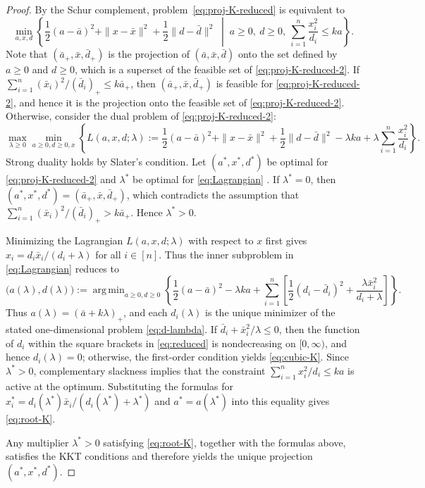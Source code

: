 \documentclass[11pt]{article}
\DeclareMathOperator*{\argmin}{arg\,min}
\theoremstyle{plain}
\begin{document}
\begin{proof}\;
By the Schur complement, problem~\eqref{eq:proj-K-reduced} is equivalent to
\begin{equation}
\label{eq:proj-K-reduced-2}
\min_{a,x,d}\left\{
\frac12(a-\bar a)^2+\|x-\bar x\|^2+\frac12\|d-\bar d\|^2
\;\middle|\;
a\ge 0,\ d\ge 0,\ \sum_{i=1}^n \frac{x_i^2}{d_i}\le k a
\right\}.
\end{equation}
Note that $(\bar{a}_+,\bar{x},\bar{d}_+)$ is the projection of $(\bar a,\bar x,\bar d)$ onto the set defined by $a\ge 0$ and $d\ge 0$, which is a superset of the feasible set of \eqref{eq:proj-K-reduced-2}.
If
 $\sum_{i=1}^n (\bar{x}_i)^2/(\bar{d}_i)_+\le k \bar{a}_+$,
then $(\bar{a}_+,\bar{x},\bar{d}_+)$ is feasible for \eqref{eq:proj-K-reduced-2}, and hence it is the projection onto the feasible set of \eqref{eq:proj-K-reduced-2}.
Otherwise, consider the dual problem of \eqref{eq:proj-K-reduced-2}:
\begin{equation} \label{eq:Lagrangian}
\max_{\lambda\ge 0}\min_{a\geq 0,d\geq 0,x}\left\{
L(a,x,d;\lambda):=\frac12(a-\bar a)^2+\|x-\bar x\|^2+\frac12\|d-\bar d\|^2
-\lambda k a + \lambda \sum_{i=1}^n \frac{x_i^2}{d_i}
\right\}.
\end{equation}
Strong duality holds by Slater's condition. Let $(a^*,x^*,d^*)$ be optimal for 
\eqref{eq:proj-K-reduced-2}
and $\lambda^*$ be optimal for \eqref{eq:Lagrangian} . If $\lambda^*=0$, then 
$(a^*,x^*,d^*)=(\bar{a}_+,\bar{x},\bar{d}_+)$, which contradicts the assumption that $\sum_{i=1}^n (\bar{x}_i)^2/(\bar{d}_i)_+ > k \bar{a}_+$. Hence $\lambda^*>0$.

Minimizing the Lagrangian $L(a,x,d;\lambda)$ with respect to $x$ first gives $x_i=d_i\bar x_i/(d_i+\lambda)$ for all $i\in[n]$. Thus the inner subproblem in \eqref{eq:Lagrangian} reduces to 
\begin{equation}
\label{eq:reduced}
\big(a(\lambda),d(\lambda)\big) := \argmin_{a\ge 0,d\ge 0}
\left\{
\frac12(a-\bar a)^2-\lambda ka
+\sum_{i=1}^n
\left[
\frac12(d_i-\bar d_i)^2+\frac{\lambda\bar x_i^2}{d_i+\lambda}
\right]
\right\}.
\end{equation}
Thus $a(\lambda)=(\bar a+k\lambda)_+$, and each $d_i(\lambda)$ is the unique minimizer of the stated one-dimensional problem \eqref{eq:d-lambda}. If $\bar d_i +{\bar x_i^2}/{\lambda}\le0$, then the function  
of $d_i$ within the square brackets in \eqref{eq:reduced} is nondecreasing on $[0,\infty)$, and hence $d_i(\lambda)=0$; otherwise, the first-order condition yields \eqref{eq:cubic-K}. Since $\lambda^*>0$, complementary slackness implies that the constraint $\sum_{i=1}^n x_i^2/d_i\le ka$ is active at the optimum. Substituting the formulas for $x_i^* = {d_i(\lambda^*)\bar{x}_i}/(d_i(\lambda^*) + \lambda^*)$ and 
$a^* = a(\lambda^*)$ into this equality gives \eqref{eq:root-K}. 

Any multiplier $\lambda^*>0$ satisfying \eqref{eq:root-K}, together with the formulas above, satisfies the KKT conditions and therefore yields the unique projection $(a^*,x^*,d^*)$.
\end{proof}
\end{document}
